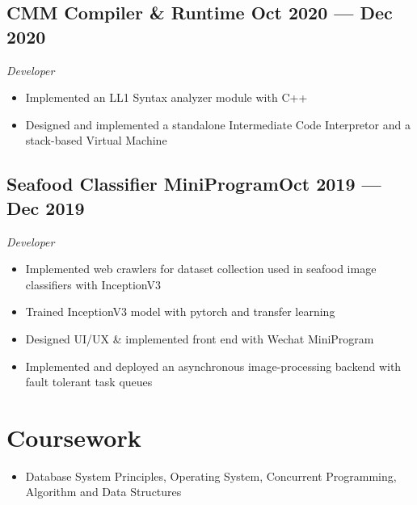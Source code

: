 \documentclass[a4,12pt]{article}
\newcommand{\subtext}[1]{
#1\par\vspace{-0.3cm}}
\newenvironment{zitemize}{
\begin{itemize}\itemsep0pt \parskip0pt \parsep1pt}
{\end{itemize}\vspace{-0.5cm}}
\begin{document}
\subsection*{CMM Compiler \& Runtime \hfill \textbf{Oct 2020 --- Dec 2020}}
\subtext{\textit{Developer}}
\begin{zitemize}
    \item Implemented an LL1 Syntax analyzer module with C++
    \item Designed and implemented a standalone Intermediate Code Interpretor and a stack-based Virtual Machine
\end{zitemize}

\subsection*{Seafood Classifier MiniProgram\hfill \textbf{Oct 2019 --- Dec 2019}}
\subtext{\textit{Developer}}
\begin{zitemize}
    \item Implemented web crawlers for dataset collection used in seafood image classifiers with InceptionV3
    \item Trained InceptionV3 model with pytorch and transfer learning
    \item Designed UI/UX \& implemented front end with Wechat MiniProgram
    \item Implemented and deployed an asynchronous image-processing backend with fault tolerant task queues
\end{zitemize}



\section{\textbf{Coursework}}
\begin{zitemize}
    \item Database System Principles, Operating System, Concurrent Programming, Algorithm and Data Structures
\end{zitemize}







\end{document}

